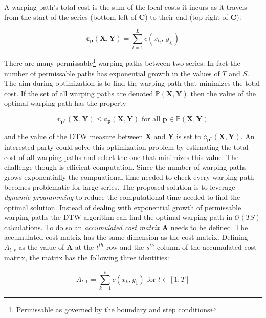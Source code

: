 \documentclass[12pt]{article}
\begin{document}
A warping path's total cost is the sum of the local costs it incurs as it travels from the start of the series (bottom left of $\boldsymbol{C}$) to their end (top right of $\boldsymbol{C}$):

\begin{equation}
    \mathbb{c}_{\boldsymbol{p}}(\boldsymbol{X}, \boldsymbol{Y}) = \sum^{L}_{l=1} c(x_{t_{l}},\, y_{s_{l}})
\end{equation}

There are many permissable\footnote{Permissable as governed by the boundary and step conditions} warping paths between two series. In fact the number of permissable paths has exponential growth in the values of $T$ and $S$. The aim during optimization is to find the warping path that minimizes the total cost. If the set of all warping paths are denoted $\mathbb{P}(\boldsymbol{X}, \boldsymbol{Y})$ then the value of the optimal warping path has the property

\begin{equation}
    \mathbb{c}_{\boldsymbol{p}^{*}}(\boldsymbol{X}, \boldsymbol{Y}) \le \mathbb{c}_{\boldsymbol{p}}(\boldsymbol{X}, \boldsymbol{Y}) \,\, \textrm{for all} \,\, \boldsymbol{p} \in \mathbb{P}(\boldsymbol{X}, \boldsymbol{Y})
\end{equation}

and the value of the DTW measure between $\boldsymbol{X}$ and $\boldsymbol{Y}$ is set to $\mathbb{c}_{\boldsymbol{p^{*}}}(\boldsymbol{X}, \boldsymbol{Y})$. An interested party could solve this optimization problem by estimating the total cost of all warping paths and select the one that minimizes this value. The challenge though is efficient computation. Since the number of warping paths grows exponentially the compuational time needed to check every warping path becomes problematic for large series. The proposed solution is to leverage \emph{dynamic programming} to reduce the computational time needed to find the optimal solution. Instead of dealing with exponential growth of permissable warping paths the DTW algorithm can find the optimal warping path in $\mathcal{O}(TS)$ calculations. To do so an \emph{accumulated cost matrix} $\boldsymbol{A}$ needs to be defined. The accumulated cost matrix has the same dimension as the cost matrix. Defining $A_{t,s}$ as the value of $\boldsymbol{A}$ at the $t^{th}$ row and the $s^{th}$ column of the accumulated cost matrix, the matrix has the following three identities:

\begin{equation}
    A_{t,1} = \sum^{t}_{k=1} c(x_{k}, y_{1}) \,\, \textrm{for} \,\, t \in [1:T]
\end{equation}
\end{document}
